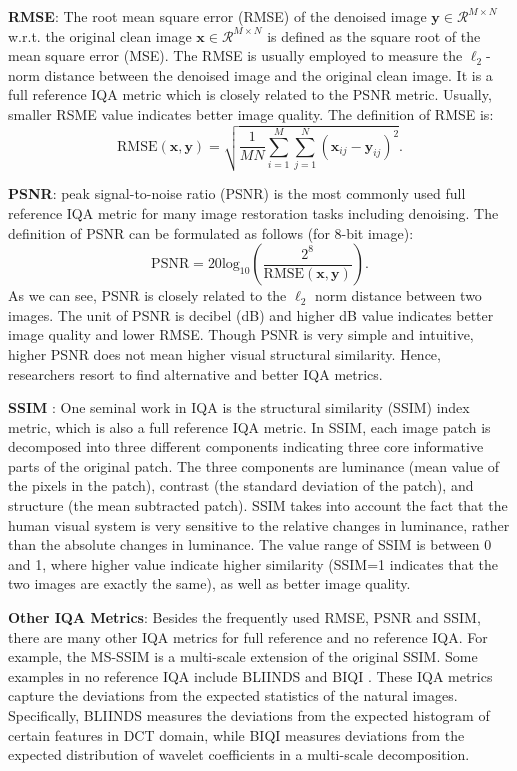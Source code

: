 \textbf{RMSE}: The root mean square error (RMSE) of the denoised image $\bm{y}\in\mathcal{R}^{M\times N}$ w.r.t. the original clean image $\bm{x}\in\mathcal{R}^{M\times N}$ is defined as the square root of the mean square error (MSE). The RMSE is usually employed to measure the $\ell_{2}$-norm distance between the denoised image and the original clean image. It is a full reference IQA metric which is closely related to the PSNR metric. Usually, smaller RSME value indicates better image quality. The definition of RMSE is:
\begin{equation}
\label{e13}
\text{RMSE}(\bm{x},\bm{y})
=
\sqrt{\frac{1}{MN}\sum_{i=1}^{M}\sum_{j=1}^{N}(\bm{x}_{ij}-\bm{y}_{ij})^{2}}.
\end{equation}



\textbf{PSNR}: peak signal-to-noise ratio (PSNR) is the most commonly used full reference IQA metric for many image restoration tasks including denoising. The definition of PSNR can be formulated as follows (for 8-bit image):
\begin{equation}
\label{e14}
\text{PSNR}
=
20\text{log}_{10}
(\frac{2^{8}}{\text{RMSE}(\bm{x},\bm{y})}).
\end{equation}
As we can see, PSNR is closely related to the $\ell_{2}$ norm distance between two images. The unit of PSNR is decibel (dB) and higher dB value indicates better image quality and lower RMSE. Though PSNR is very simple and intuitive, higher PSNR does not mean higher visual structural similarity. Hence, researchers resort to find alternative and better IQA metrics. 

\textbf{SSIM} \cite{ssim}: One seminal work in IQA is the structural similarity (SSIM) index metric, which is also a full reference IQA metric. In SSIM, each image patch is decomposed into three different components indicating three core informative parts of the original patch. The three components are luminance (mean value of the pixels in the patch), contrast (the standard deviation of the patch), and structure (the mean subtracted patch). SSIM takes into account the fact that the human visual system is very sensitive to the relative changes in luminance, rather than the absolute changes in luminance. The value range of SSIM is between 0 and 1, where higher value indicate higher similarity (SSIM=1 indicates that the two images are exactly the same), as well as better image quality. 

\textbf{Other IQA Metrics}: Besides the frequently used RMSE, PSNR and SSIM, there are many other IQA metrics for full reference and no reference IQA. For example, the MS-SSIM \cite{msssim} is a multi-scale extension of the original SSIM. Some examples in no reference IQA include BLIINDS \cite{bliinds} and BIQI \cite{biqi}. These IQA metrics capture the deviations from the expected statistics of the natural images. Specifically, BLIINDS measures the deviations from the expected histogram of certain features in DCT domain, while BIQI measures deviations from the expected distribution of wavelet coefficients in a multi-scale decomposition.

